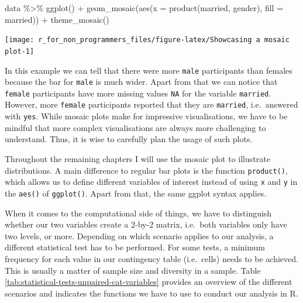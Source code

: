 \documentclass[
]{book}
\newenvironment{Shaded}{\begin{snugshade}}{\end{snugshade}}
\newcommand{\AttributeTok}[1]{\textcolor[rgb]{0.77,0.63,0.00}{#1}}
\newcommand{\FunctionTok}[1]{\textcolor[rgb]{0.00,0.00,0.00}{#1}}
\newcommand{\NormalTok}[1]{#1}
\newcommand{\SpecialCharTok}[1]{\textcolor[rgb]{0.00,0.00,0.00}{#1}}
\begin{document}
\begin{Shaded}
\begin{Highlighting}[]
\NormalTok{data }\SpecialCharTok{\%\textgreater{}\%}
  \FunctionTok{ggplot}\NormalTok{() }\SpecialCharTok{+}
  \FunctionTok{geom\_mosaic}\NormalTok{(}\FunctionTok{aes}\NormalTok{(}\AttributeTok{x =} \FunctionTok{product}\NormalTok{(married, gender),}
                  \AttributeTok{fill =}\NormalTok{ married)) }\SpecialCharTok{+} 
  \FunctionTok{theme\_mosaic}\NormalTok{()}
\end{Highlighting}
\end{Shaded}

\begin{center}\texttt{[image: r\_for\_non\_programmers\_files/figure-latex/Showcasing a mosaic plot-1]} \end{center}

In this example we can tell that there were more \texttt{male} participants than females because the bar for \texttt{male} is much wider. Apart from that we can notice that \texttt{female} participants have more missing values \texttt{NA} for the variable \texttt{married}. However, more \texttt{female} participants reported that they are \texttt{married}, i.e.~answered with \texttt{yes}. While mosaic plots make for impressive visualisations, we have to be mindful that more complex visualisations are always more challenging to understand. Thus, it is wise to carefully plan the usage of such plots.

Throughout the remaining chapters I will use the mosaic plot to illustrate distributions. A main difference to regular bar plots is the function \texttt{product()}, which allows us to define different variables of interest instead of using \texttt{x} and \texttt{y} in the \texttt{aes()} of \texttt{ggplot()}. Apart from that, the same ggplot syntax applies.

When it comes to the computational side of things, we have to distinguish whether our two variables create a 2-by-2 matrix, i.e.~both variables only have two levels, or more. Depending on which scenario applies to our analysis, a different statistical test has to be performed. For some tests, a minimum frequency for each value in our contingency table (i.e.~cells) needs to be achieved. This is usually a matter of sample size and diversity in a sample. Table \ref{tab:statistical-tests-unpaired-cat-variables} provides an overview of the different scenarios and indicates the functions we have to use to conduct our analysis in R.
\end{document}
